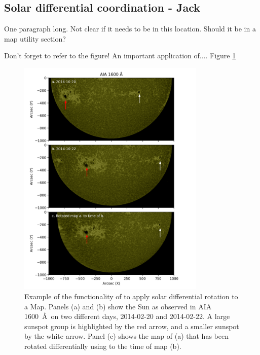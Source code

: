 \subsection{Solar differential coordination - Jack}
One paragraph long.
Not clear if it needs to be in this location.
Should it be in a map utility section?

Don't forget to refer to the figure!
An important application of....
Figure \ref{fig:diff_rot}


\begin{figure}
    \center
    \includegraphics[width = 0.8\textwidth]{figures/diff_rot_aia1600.png}
    \caption{Example of the functionality of \sunpy to apply solar differential rotation to a Map.
    Panels (a) and (b) show the Sun as observed in AIA 1600~\AA\ on two different days, 2014-02-20 and 2014-02-22.
    A large sunspot group is highlighted by the red arrow, and a smaller sunspot by the white arrow.
    Panel (c) shows the map of (a) that has been rotated differentially using \sunpy to the time of map (b).}
    \label{fig:diff_rot}
\end{figure}
